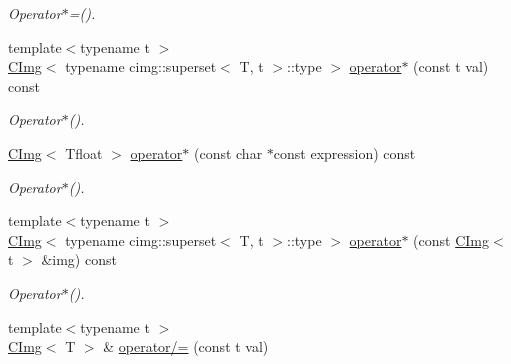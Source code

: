 \begin{DoxyCompactItemize}
\begin{DoxyCompactList}\small\item\em Operator$\ast$=(). \item\end{DoxyCompactList}\item 
\hypertarget{structcimg__library_1_1CImg_a7bbce400266413cb6eac04e407423448}{
{\footnotesize template$<$typename t $>$ }\\\hyperlink{structcimg__library_1_1CImg}{CImg}$<$ typename cimg::superset$<$ T, t $>$::type $>$ \hyperlink{structcimg__library_1_1CImg_a7bbce400266413cb6eac04e407423448}{operator$\ast$} (const t val) const }
\label{structcimg__library_1_1CImg_a7bbce400266413cb6eac04e407423448}

\begin{DoxyCompactList}\small\item\em Operator$\ast$(). \item\end{DoxyCompactList}\item 
\hypertarget{structcimg__library_1_1CImg_aa9516fddfe5db7f149f799451707da8b}{
\hyperlink{structcimg__library_1_1CImg}{CImg}$<$ Tfloat $>$ \hyperlink{structcimg__library_1_1CImg_aa9516fddfe5db7f149f799451707da8b}{operator$\ast$} (const char $\ast$const expression) const }
\label{structcimg__library_1_1CImg_aa9516fddfe5db7f149f799451707da8b}

\begin{DoxyCompactList}\small\item\em Operator$\ast$(). \item\end{DoxyCompactList}\item 
\hypertarget{structcimg__library_1_1CImg_a5141d0bfe5b48c5a1ea9f30d03fd04f5}{
{\footnotesize template$<$typename t $>$ }\\\hyperlink{structcimg__library_1_1CImg}{CImg}$<$ typename cimg::superset$<$ T, t $>$::type $>$ \hyperlink{structcimg__library_1_1CImg_a5141d0bfe5b48c5a1ea9f30d03fd04f5}{operator$\ast$} (const \hyperlink{structcimg__library_1_1CImg}{CImg}$<$ t $>$ \&img) const }
\label{structcimg__library_1_1CImg_a5141d0bfe5b48c5a1ea9f30d03fd04f5}

\begin{DoxyCompactList}\small\item\em Operator$\ast$(). \item\end{DoxyCompactList}\item 
\hypertarget{structcimg__library_1_1CImg_a9a6123b197ed6406eda560863bbe4cc1}{
{\footnotesize template$<$typename t $>$ }\\\hyperlink{structcimg__library_1_1CImg}{CImg}$<$ T $>$ \& \hyperlink{structcimg__library_1_1CImg_a9a6123b197ed6406eda560863bbe4cc1}{operator/=} (const t val)}
\label{structcimg__library_1_1CImg_a9a6123b197ed6406eda560863bbe4cc1}


\end{DoxyCompactItemize}
